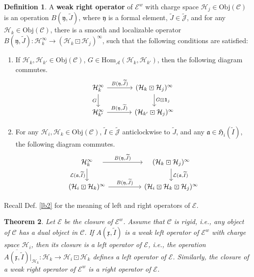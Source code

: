 \documentclass[11pt,b5paper,notitlepage]{article}
\theoremstyle{definition}
\newtheorem{df}{Definition}[section]
\theoremstyle{plain}
\newtheorem{thm}[df]{Theorem}
\newcommand{\fk}{\mathfrak}
\newcommand{\mc}{\mathcal}
\newcommand{\wtd}{\widetilde}
\newcommand{\ovl}{\overline}
\newcommand{\idt}{\mathbf{1}}
\newcommand{\Hom}{\mathrm{Hom}}
\newcommand{\scr}{\mathscr}
\newcommand{\Jtd}{\widetilde{\mathcal J}}
\newcommand{\xk}{\mathfrak x}
\newcommand{\yk}{\mathfrak y}
\newcommand{\Obj}{\mathrm{Obj}}
\numberwithin{equation}{section}
\begin{document}
\begin{df}\label{lb10}
A \textbf{weak right operator} of $\scr E^w$ with charge space $\mc H_j\in\Obj(\scr C)$ is an operation $B(\yk,\wtd J)$, where $\fk y$ is a formal element, $\wtd J\in\Jtd$, and for any $\mc H_k\in\Obj(\scr C)$, there is a smooth and localizable operator $B(\fk y,\wtd J):\mc H_k^\infty\rightarrow(\mc H_k\boxdot\mc H_j)^\infty$, such that the following conditions are satisfied:

\begin{enumerate}[label=(\alph*)]
\item If $\mc H_k,\mc H_{k'}\in\Obj(\scr C)$, $G\in\Hom_{\mc A}(\mc H_k,\mc H_{k'})$, then  the following diagram commutes.
\begin{equation}
\begin{tikzcd}[column sep=large]
\mc H_k^\infty \arrow[r,"{B(\yk,\wtd J)}"] \arrow[d,"G"'] & (\mc H_k\boxdot\mc H_j)^\infty \arrow[d,"G\boxdot\idt_j"] \\
\mc H_{k'}^\infty \arrow[r,"{B(\yk,\wtd J)}"]           & (\mc H_{k'}\boxdot\mc H_j)^\infty  
\end{tikzcd}  
\end{equation}
\item For any $\mc H_i,\mc H_k\in\Obj(\scr C)$,  $\wtd I\in\Jtd$  anticlockwise to $\wtd J$, and any $\fk a\in\fk H_i(\wtd I)$, the following diagram  commutes.
\begin{equation}
\begin{tikzcd}[column sep=huge]
\quad \mc H_k^\infty\quad \arrow[r,"{B(\yk,\wtd J)}"] \arrow[d, "{\mc L(\fk a,\wtd I)}"'] &\quad (\mc H_k\boxdot\mc H_j)^\infty\quad \arrow[d, "{\mc L(\fk a,\wtd I)}"]\\
(\mc H_i\boxdot\mc H_k)^\infty\arrow[r,"{B(\yk,\wtd J)}"] &(\mc H_i\boxdot\mc H_k\boxdot\mc H_j)^\infty
\end{tikzcd}
\end{equation}
\end{enumerate}
\end{df}



Recall Def. \ref{lb2} for the meaning of left and right operators of $\scr E$.

\begin{thm}\label{lb13}
Let $\scr E$ be the closure of $\scr E^w$. Assume that $\scr C$ is rigid, i.e., any object of $\scr C$ has a dual object in $\scr C$. If $A(\xk,\wtd I)$ is a weak left operator of $\scr E^w$ with charge space $\mc H_i$, then its closure is a left operator of $\scr E$, i.e., the operation $\ovl{ A(\fk x,\wtd I)}|_{\mc H_k}:\mc H_k\rightarrow\mc H_i\boxdot\mc H_k$ defines a left operator of $\scr E$. Similarly, the closure of a weak right operator of $\scr E^w$ is a right operator of $\scr E$.
\end{thm}
\end{document}
